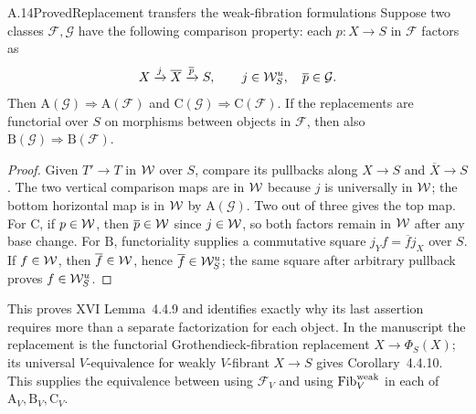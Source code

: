 \begin{claim}{A.14}{Proved}{Replacement transfers the weak-fibration formulations}
Suppose two classes $\mathcal F,\mathcal G$ have the following comparison property: each $p:X\to S$ in $\mathcal F$ factors as
\[
X\xrightarrow{j}\overline X\xrightarrow{\overline p}S,
\qquad j\in\mathcal{W}_S^u,\quad\overline p\in\mathcal G.
\]
Then $\mathrm A(\mathcal G)\Rightarrow\mathrm A(\mathcal F)$ and $\mathrm C(\mathcal G)\Rightarrow\mathrm C(\mathcal F)$. If the replacements are functorial over $S$ on morphisms between objects in $\mathcal F$, then also $\mathrm B(\mathcal G)\Rightarrow\mathrm B(\mathcal F)$.
\end{claim}
\begin{proof}
Given $T'\to T$ in $\mathcal{W}$ over $S$, compare its pullbacks along $X\to S$ and $\overline X\to S$. The two vertical comparison maps are in $\mathcal{W}$ because $j$ is universally in $\mathcal{W}$; the bottom horizontal map is in $\mathcal{W}$ by $\mathrm A(\mathcal G)$. Two out of three gives the top map. For $\mathrm C$, if $p\in\mathcal{W}$, then $\overline p\in\mathcal{W}$ since $j\in\mathcal{W}$, so both factors remain in $\mathcal{W}$ after any base change. For $\mathrm B$, functoriality supplies a commutative square $j_Yf=\overline f j_X$ over $S$. If $f\in\mathcal{W}$, then $\overline f\in\mathcal{W}$, hence $\overline f\in\mathcal{W}_S^u$; the same square after arbitrary pullback proves $f\in\mathcal{W}_S^u$.
\end{proof}
This proves XVI Lemma~4.4.9 and identifies exactly why its last assertion requires more than a separate factorization for each object. In the manuscript the replacement is the functorial Grothendieck-fibration replacement $X\to\Phi_S(X)$; its universal $V$-equivalence for weakly $V$-fibrant $X\to S$ gives Corollary~4.4.10. This supplies the equivalence between using $\mathcal F_V$ and using $\operatorname{Fib}^{\mathrm{weak}}_V$ in each of $\mathrm A_V,\mathrm B_V,\mathrm C_V$.


